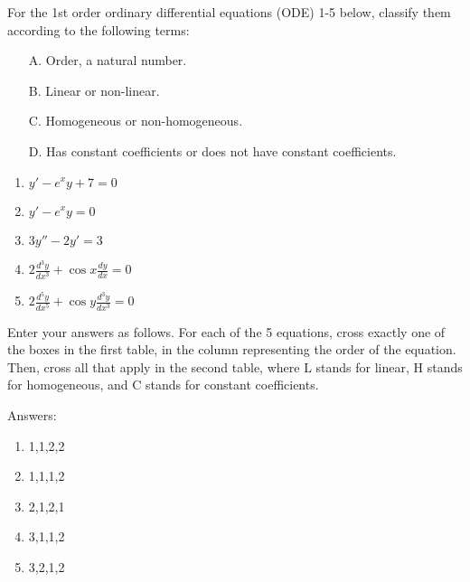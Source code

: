 \documentclass{uob-cs-exam}
\begin{document}
\begin{questions}
\question[2]
For the 1st order ordinary differential equations (ODE) 1-5 below, classify them according to the following terms: 
\begin{itemize}
\item[A.] Order, a natural number.
\item[B.] Linear or non-linear.
\item[C.] Homogeneous or non-homogeneous. 
\item[D.] Has constant coefficients or does not have constant coefficients.
\end{itemize}
\begin{enumerate}
\item $y' - e^xy+7=0$
\item $y' - e^xy =0$
\item $3y'' - 2y' =3$
\item $2 \frac{d^3y}{dx^3} + \cos x \frac{dy}{dx} = 0$
\item $2 \frac{d^5y}{dx^5} + \cos y \frac{d^3y}{dx^3} = 0$
\end{enumerate}
Enter your answers as follows. For each of the 5 equations, cross exactly one of the boxes in the first table, in the column representing the order of the equation. Then, cross all that apply in the second table, where L stands for linear, H stands for homogeneous, and C stands for constant coefficients.

\droppoints

\begin{solution}
Answers:
\begin{enumerate}
\item 1,1,2,2
\item  1,1,1,2
\item  2,1,2,1
\item  3,1,1,2
\item  3,2,1,2
\end{enumerate}
\end{solution}


%



\end{questions}
\end{document}
